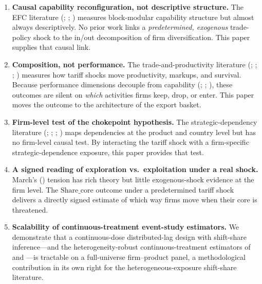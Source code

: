 \begin{enumerate}
\item \textbf{Causal capability reconfiguration, not descriptive structure.} The EFC
literature (\citealp{bruno2023}; \citealp{pugliese2019}; \citealp{destefano2025})
measures block-modular capability structure but almost always descriptively. No prior
work links a \emph{predetermined, exogenous} trade-policy shock to the in/out
decomposition of firm diversification. This paper supplies that causal link.

\item \textbf{Composition, not performance.} The trade-and-productivity literature
(\citealp{pavcnik2002}; \citealp{topalova2011}; \citealp{amiti2007}; \citealp{tomasi2022})
measures how tariff shocks move productivity, markups, and survival. Because
performance dimensions decouple from capability (\citealp{grazzi2012};
\citealp{coad2021}; \citealp{syverson2011}), these outcomes are silent on \emph{which}
activities firms keep, drop, or enter. This paper moves the outcome to the architecture
of the export basket.

\item \textbf{Firm-level test of the chokepoint hypothesis.} The strategic-dependency
literature (\citealp{farrell2019}; \citealp{euc2021}; \citealp{arjona2023};
\citealp{korniyenko2017}) maps dependencies at the product and country level but has no
firm-level causal test. By interacting the tariff shock with a firm-specific
strategic-dependence exposure, this paper provides that test.

\item \textbf{A signed reading of exploration vs.\ exploitation under a real shock.}
March's (\citeyear{march1991}) tension has rich theory but little exogenous-shock
evidence at the firm level. The $\text{Share\_core}$ outcome under a predetermined tariff shock
delivers a directly signed estimate of which way firms move when their core is
threatened.

\item \textbf{Scalability of continuous-treatment event-study estimators.} We demonstrate
that a continuous-dose distributed-lag design with \citet{adao2019} shift-share inference---and
the heterogeneity-robust continuous-treatment estimators of \citet{dechaisemartin2020} and
\citet{callawaygoodmanbacon2024}---is tractable on a full-universe firm--product panel, a
methodological contribution in its own right for the heterogeneous-exposure shift-share
literature.
\end{enumerate}

